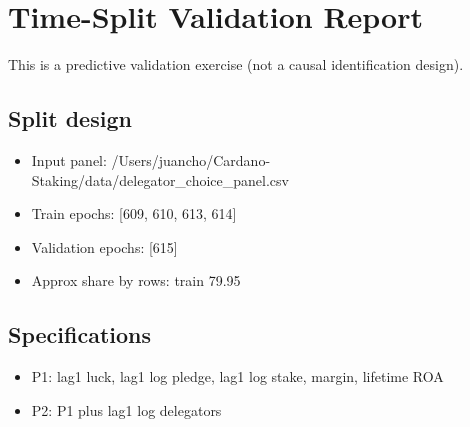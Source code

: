 \documentclass[11pt]{article}
\begin{document}
\section*{Time-Split Validation Report}
This is a predictive validation exercise (not a causal identification design).
\subsection*{Split design}
\begin{itemize}
\item Input panel: /Users/juancho/Cardano-Staking/data/delegator\_choice\_panel.csv
\item Train epochs: [609, 610, 613, 614]
\item Validation epochs: [615]
\item Approx share by rows: train 79.95%
\end{itemize}
\subsection*{Specifications}
\begin{itemize}
\item P1: lag1 luck, lag1 log pledge, lag1 log stake, margin, lifetime ROA
\item P2: P1 plus lag1 log delegators
\end{itemize}
\end{document}
